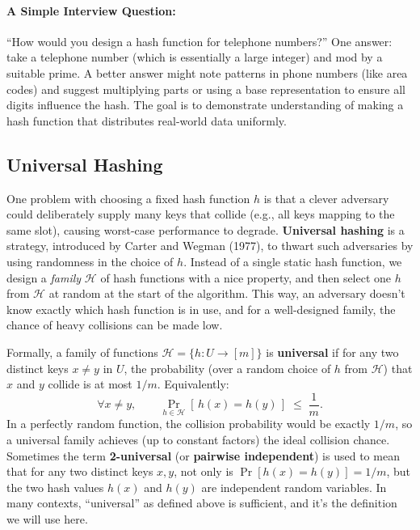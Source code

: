 \documentclass[11pt]{article}
\begin{document}
\paragraph{A Simple Interview Question:} “How would you design a hash function for telephone numbers?” One answer: take a telephone number (which is essentially a large integer) and mod by a suitable prime. A better answer might note patterns in phone numbers (like area codes) and suggest multiplying parts or using a base representation to ensure all digits influence the hash. The goal is to demonstrate understanding of making a hash function that distributes real-world data uniformly.

\subsection{Universal Hashing}
One problem with choosing a fixed hash function $h$ is that a clever adversary could deliberately supply many keys that collide (e.g., all keys mapping to the same slot), causing worst-case performance to degrade. \textbf{Universal hashing} is a strategy, introduced by Carter and Wegman (1977), to thwart such adversaries by using randomness in the choice of $h$. Instead of a single static hash function, we design a \emph{family} $\mathcal{H}$ of hash functions with a nice property, and then select one $h$ from $\mathcal{H}$ at random at the start of the algorithm. This way, an adversary doesn’t know exactly which hash function is in use, and for a well-designed family, the chance of heavy collisions can be made low.

Formally, a family of functions $\mathcal{H} = \{h: U \to [m]\}$ is \textbf{universal} if for any two distinct keys $x \neq y$ in $U$, the probability (over a random choice of $h$ from $\mathcal{H}$) that $x$ and $y$ collide is at most $1/m$. Equivalently:
\[ \forall x \neq y, \qquad \Pr_{h \in \mathcal{H}}[\,h(x) = h(y)\,] \;\le\; \frac{1}{m}. \] 
In a perfectly random function, the collision probability would be exactly $1/m$, so a universal family achieves (up to constant factors) the ideal collision chance. Sometimes the term \textbf{2-universal} (or \textbf{pairwise independent}) is used to mean that for any two distinct keys $x,y$, not only is $\Pr[h(x)=h(y)]=1/m$, but the two hash values $h(x)$ and $h(y)$ are independent random variables. In many contexts, “universal” as defined above is sufficient, and it’s the definition we will use here.
\end{document}
